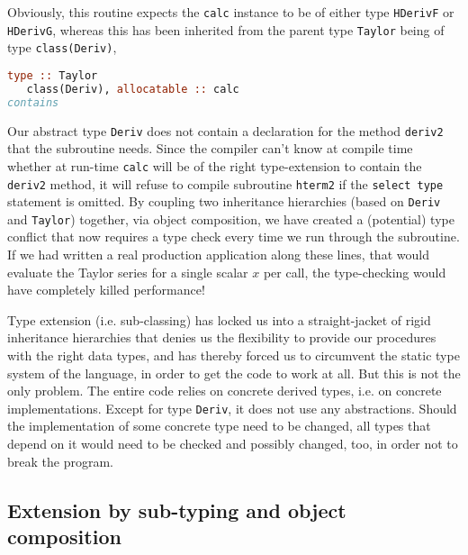 \documentclass[11pt,oneside]{article}
\begin{document}
Obviously, this routine expects the \texttt{calc} instance to be of
either type \texttt{HDerivF} or \texttt{HDerivG}, whereas this has
been inherited from the parent type \texttt{Taylor} being of type
\texttt{class(Deriv)},
\begin{lstlisting}[language=Fortran]
type :: Taylor
   class(Deriv), allocatable :: calc
contains
\end{lstlisting}
Our abstract type \texttt{Deriv} does not contain a declaration for
the method \texttt{deriv2} that the subroutine needs. Since the
compiler can't know at compile time whether at run-time \texttt{calc}
will be of the right type-extension to contain the \texttt{deriv2}
method, it will refuse to compile subroutine \texttt{hterm2} if the
\texttt{select type} statement is omitted. By coupling two inheritance
hierarchies (based on \texttt{Deriv} and \texttt{Taylor}) together, via
object composition, we have created a (potential) type conflict that
now requires a type check every time we run through the subroutine. If
we had written a real production application along these lines, that
would evaluate the Taylor series for a single scalar $x$ per call, the
type-checking would have completely killed performance!

Type extension (i.e. sub-classing) has locked us into a
straight-jacket of rigid inheritance hierarchies that denies us the
flexibility to provide our procedures with the right data types, and
has thereby forced us to circumvent the static type system of the
language, in order to get the code to work at all. But this is not the
only problem. The entire code relies on concrete derived types,
i.e. on concrete implementations. Except for type \texttt{Deriv}, it
does not use any abstractions. Should the implementation of some
concrete type need to be changed, all types that depend on it would
need to be checked and possibly changed, too, in order not to break
the program.

\subsection{Extension by sub-typing and object composition}
\end{document}

